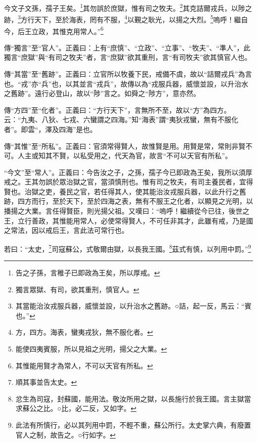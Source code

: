 今文子文孫，孺子王矣。\footnote{告之子孫，言稚子已即政為王矣，所以厚戒。}其勿誤於庶獄，惟有司之牧夫。\footnote{獨言眾獄、有司，欲其重刑，慎官人。}其克詰爾戎兵，以陟之跡，\footnote{其當能治汝戎服兵器，威懷並設，以升治水之舊跡。○詰，起一反，馬云：“賓也。”}方行天下，至於海表，罔有不服，\footnote{方，四方。海表，蠻夷戎狄，無不服化者。}以覲之耿光，以揚之大烈。\footnote{能使四夷賓服，所以見祖之光明，揚父之大業。}嗚呼！繼自今，后王立政，其惟克用常人。”\footnote{其惟能用賢才為常人，不可以天官有所私。}


{\noindent\zhuan{}\fzbyks 傳“獨言”至“官人”。正義曰：上有“庶慎”、“立政”、“立事”、“牧夫”、“準人”，此獨言“庶獄”與“有司之牧夫”者，言“庶獄”欲其重刑，言“有司牧夫”欲其慎官人也。 \par}

{\noindent\zhuan{}\fzbyks 傳“其當”至“舊跡”。正義曰：立官所以牧養下民，戒備不虞，故以“詰爾戎兵”為言也。“戎”亦“兵”也，以其並言“戎兵”，故傳以為“戎服兵器，威懷並設，以升治水之舊跡”。遠行必登山，故以“陟”言之。如舜之“陟方”，意亦然。 \par}

{\noindent\zhuan{}\fzbyks 傳“方四”至“化者”。正義曰：“方行天下”，言無所不至，故以“方”為四方。云：“九夷、八狄、七戎、六蠻謂之四海。”知“海表”謂“夷狄戎蠻，無有不服化者”。即雲“，澤及四海”是也。 \par}

{\noindent\zhuan{}\fzbyks 傳“其惟”至“所私”。正義曰：官須常得賢人，故惟賢是用。用賢是常，常則非賢不可。人主或知其不賢，以私受用之，代天為官，故言“不可以天官有所私”。 \par}

{\noindent\shu{}\fzkt “今文”至“常人”。正義曰：今告汝之子，之孫，孺子今已即政為王矣，我所以須厚戒之。王其勿誤於眾治獄之官，當須慎刑也。惟有司之牧夫，有司主養民者，宜得賢也。治獄之吏，養民之官，若任得其人，使其能治汝戎服兵器，以此升行之舊跡，四方而行，至於天下，至於四海之表，無有不服王之化者，以顯見之光明，以播揚之大業。言任得賢臣，則光揚父祖。又嘆曰：“嗚呼！繼續從今已往，後世之王，立行善政，其惟能用常人，必使常得賢人，不可任非其才，此雖有戒，乃是國之常法，因以戒后王，言此法可常行也。 \par}

若曰：“太史，\footnote{順其事並告太史。}司寇蘇公，式敬爾由獄，以長我王國。\footnote{忿生為司寇，封蘇國，能用法。敬汝所用之獄，以長施行於我王國。言主獄當求蘇公之比。○比，必二反，又如字。}茲式有慎，以列用中罰。”\footnote{此法有所慎行，必以其列用中罰，不輕不重，蘇公所行。太史掌六典，有廢置官人之制，故告之。○行如字。}


